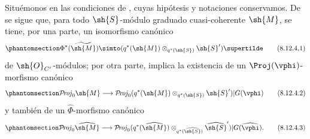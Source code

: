 \documentclass[oneside,10pt]{amsart}
\makeatletter
\newcommand{\ega@arrow}[2]{\mathchoice{#1}{#2}{#2}{#2}}
\renewcommand{\to}{\ega@arrow{\longrightarrow}{\rightarrow}}
\def\shProj{\mathcal{P}\!\mathit{roj}}
\let\EGAOriginalLabel\label
\renewcommand{\label}[1]{\phantomsection\EGAOriginalLabel{#1}}
\makeatother
\begin{document}
\begin{env}[8.12.4]
\label{II.8.12.4}
Situémonos en las condiciones de , cuyas hipótesis y notaciones conservamos.
De  se sigue que, para todo $\sh{S}$-módulo graduado cuasi-coherente $\sh{M}$, se tiene, por una parte, un isomorfismo canónico
\[
\label{II.8.12.4.1}
    \Phi^*(\widetilde{\sh{M}}) \simto (q^*(\sh{M})\otimes_{q^*(\sh{S})}\sh{S}')\supertilde
\tag{8.12.4.1}
\]
de $\sh{O}_{C'}$-módulos;
por otra parte,  implica la existencia de un $\Proj(\vphi)$-morfismo canónico
\[
\label{II.8.12.4.2}
    \shProj_0\sh{M} \to \shProj_0(q^*(\sh{M})\otimes_{q^*(\sh{S})}\sh{S}')|G(\vphi)
\tag{8.12.4.2}
\]
y también de un $\widehat{\Phi}$-morfismo canónico
\[
\label{II.8.12.4.3}
    \shProj_0\widehat{\sh{M}} \to \shProj_0(q^*(\widehat{\sh{M}})\otimes_{q^*(\widehat{\sh{S}})}\widehat{\sh{S}}')|G(\widehat{\vphi}).
\tag{8.12.4.3}
\]
\end{env}
\end{document}
